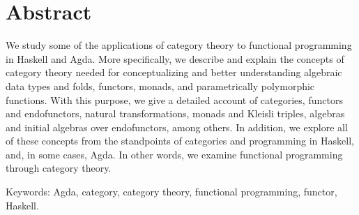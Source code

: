 \chapter{Abstract}
\label{chap:abstract}

We study some of the applications of category theory to functional
programming in Haskell and Agda. More specifically, we describe and
explain the concepts of category theory needed for conceptualizing and
better understanding algebraic data types and folds, functors, monads,
and parametrically polymorphic functions. With this purpose, we give a
detailed account of categories, functors and endofunctors, natural
transformations, monads and Kleisli triples, algebras and initial
algebras over endofunctors, among others. In addition, we explore all
of these concepts from the standpoints of categories and programming
in Haskell, and, in some cases, Agda. In other words, we examine
functional programming through category theory.

\vspace{1em}
\noindent
Keywords: Agda, category, category theory, functional programming,
functor, Haskell.

\clearemptydoublepage
